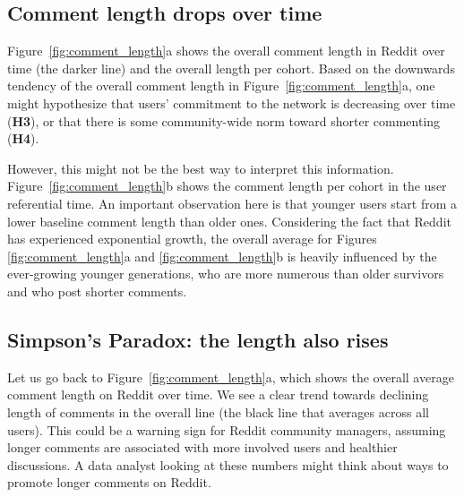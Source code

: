 \subsection{Comment length drops over time}

Figure~\ref{fig:comment_length}a shows the overall comment length in Reddit over time (the darker line) and the overall length per cohort. 
Based on the downwards tendency of the overall comment length in Figure~\ref{fig:comment_length}a, one might hypothesize that users' commitment to the network is decreasing over time (\textbf{H3}), or that there is some community-wide norm toward shorter commenting (\textbf{H4}). 

However, this might not be the best way to interpret this information. Figure~\ref{fig:comment_length}b shows the comment length per cohort in the user referential time. An important observation here is that younger users start from a lower baseline comment length than older ones. Considering the fact that Reddit has experienced exponential growth, the overall average for Figures \ref{fig:comment_length}a and \ref{fig:comment_length}b is heavily influenced by the ever-growing younger generations, who are more numerous than older survivors and who post shorter comments. 

\subsection{Simpson's Paradox: the length also rises}

Let us go back to Figure~\ref{fig:comment_length}a, which shows the overall average comment length on Reddit over time. We see a clear trend towards declining length of comments in the overall line (the black line that averages across all users). This could be a warning sign for Reddit community managers, assuming longer comments are associated with more involved users and healthier discussions. A data analyst looking at these numbers might think about ways to promote longer comments on Reddit. 

